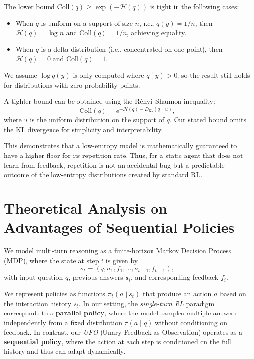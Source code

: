 \begin{remark}
The lower bound $\mathrm{Coll}(q) \ge \exp(-\mathcal{H}(q))$ is tight in the following cases:
\begin{itemize}
    \item When $q$ is uniform on a support of size $n$, i.e., $q(y) = 1/n$, then $\mathcal{H}(q) = \log n$ and $\mathrm{Coll}(q) = 1/n$, achieving equality.
    \item When $q$ is a delta distribution (i.e., concentrated on one point), then $\mathcal{H}(q) = 0$ and $\mathrm{Coll}(q) = 1$.
\end{itemize}
We assume $\log q(y)$ is only computed where $q(y) > 0$, so the result still holds for distributions with zero-probability points.

A tighter bound can be obtained using the Rényi–Shannon inequality:
\[
\mathrm{Coll}(q) = e^{ -\mathcal{H}(q) - D_{\mathrm{KL}}(q \parallel u)},
\]
where $u$ is the uniform distribution on the support of $q$. Our stated bound omits the KL divergence for simplicity and interpretability.
\end{remark}

\noindent
This demonstrates that a low-entropy model is mathematically guaranteed to have a higher floor for its repetition rate. Thus, for a static agent that does not learn from feedback, repetition is not an accidental bug but a predictable outcome of the low-entropy distributions created by standard RL.

\section{Theoretical Analysis on Advantages of Sequential Policies}
\label{app:theory-ufo}
We model multi-turn reasoning as a finite-horizon Markov Decision Process (MDP), where the state at step \( t \) is given by
\[
s_t = (q, a_1, f_1, \dots, a_{t-1}, f_{t-1}),
\]
with input question \( q \), previous answers \( a_i \), and corresponding feedback \( f_i \). 

We represent policies as functions \( \pi_t(a \mid s_t) \) that produce an action \( a \) based on the interaction history \( s_t \). In our setting, the \textit{single-turn RL} paradigm corresponds to a \textbf{parallel policy}, where the model samples multiple answers independently from a fixed distribution \( \pi(a \mid q) \) without conditioning on feedback. In contrast, our \textit{UFO} (Unary Feedback as Observation) operates as a \textbf{sequential policy}, where the action at each step is conditioned on the full history and thus can adapt dynamically.

